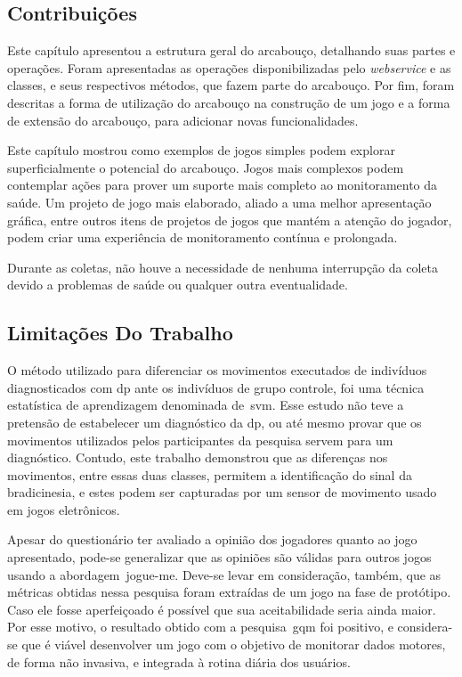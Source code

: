 \subsection{Contribuições}\label{sec:contribuicoes}



Este capítulo apresentou a estrutura geral do arcabouço, detalhando suas partes e operações. Foram apresentadas as operações disponibilizadas pelo \emph{webservice} e as classes, e seus respectivos métodos, que fazem parte do arcabouço. Por fim, foram descritas a forma de utilização do arcabouço na construção de um jogo e a forma de extensão do arcabouço, para adicionar novas funcionalidades.


Este capítulo mostrou como exemplos de jogos simples podem explorar superficialmente o potencial do arcabouço. Jogos mais complexos podem contemplar ações para prover um suporte mais completo ao monitoramento da saúde. Um projeto de jogo mais elaborado, aliado a uma melhor apresentação gráfica, entre outros itens de projetos de jogos que mantém a atenção do jogador, podem criar uma experiência de monitoramento contínua e prolongada.

Durante as coletas, não houve a necessidade de nenhuma interrupção da coleta devido a problemas de saúde ou qualquer outra eventualidade.

\subsection{Limitações Do Trabalho}\label{sec:limitacoes}

O método utilizado para diferenciar os movimentos executados de indivíduos diagnosticados com \ac{dp} ante os indivíduos de grupo controle, foi uma técnica estatística de aprendizagem denominada de~\ac{svm}. Esse estudo não teve a pretensão de estabelecer um diagnóstico da \ac{dp}, ou até mesmo provar que os movimentos utilizados pelos participantes da pesquisa servem para um diagnóstico. Contudo, este trabalho demonstrou que as diferenças nos movimentos, entre essas duas classes, permitem a identificação do sinal da bradicinesia, e estes podem ser capturadas por um sensor de movimento usado em jogos eletrônicos. 

Apesar do questionário ter avaliado a opinião dos jogadores quanto ao jogo apresentado, pode-se generalizar que as opiniões são válidas para outros jogos usando a abordagem~\ac{jogue-me}. Deve-se levar em consideração, também, que as métricas obtidas nessa pesquisa foram extraídas de um jogo na fase de protótipo. Caso ele fosse aperfeiçoado é possível que sua aceitabilidade seria ainda maior. Por esse motivo, o resultado obtido com a pesquisa~\ac{gqm} foi positivo, e considera-se que é viável desenvolver um jogo com o objetivo de monitorar dados motores, de forma não invasiva, e integrada à rotina diária dos usuários.


